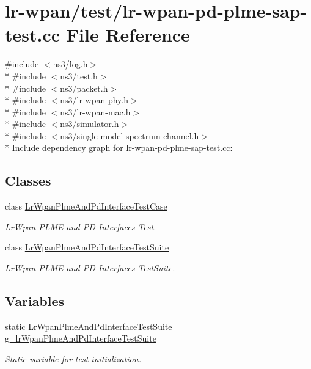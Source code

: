 \hypertarget{lr-wpan-pd-plme-sap-test_8cc}{}\section{lr-\/wpan/test/lr-\/wpan-\/pd-\/plme-\/sap-\/test.cc File Reference}
\label{lr-wpan-pd-plme-sap-test_8cc}
{\ttfamily \#include $<$ns3/log.\+h$>$}\\*
{\ttfamily \#include $<$ns3/test.\+h$>$}\\*
{\ttfamily \#include $<$ns3/packet.\+h$>$}\\*
{\ttfamily \#include $<$ns3/lr-\/wpan-\/phy.\+h$>$}\\*
{\ttfamily \#include $<$ns3/lr-\/wpan-\/mac.\+h$>$}\\*
{\ttfamily \#include $<$ns3/simulator.\+h$>$}\\*
{\ttfamily \#include $<$ns3/single-\/model-\/spectrum-\/channel.\+h$>$}\\*
Include dependency graph for lr-\/wpan-\/pd-\/plme-\/sap-\/test.cc\+:
\subsection*{Classes}
\begin{DoxyCompactItemize}
\item 
class \hyperlink{classLrWpanPlmeAndPdInterfaceTestCase}{Lr\+Wpan\+Plme\+And\+Pd\+Interface\+Test\+Case}
\begin{DoxyCompactList}\small\item\em Lr\+Wpan P\+L\+ME and PD Interfaces Test. \end{DoxyCompactList}\item 
class \hyperlink{classLrWpanPlmeAndPdInterfaceTestSuite}{Lr\+Wpan\+Plme\+And\+Pd\+Interface\+Test\+Suite}
\begin{DoxyCompactList}\small\item\em Lr\+Wpan P\+L\+ME and PD Interfaces Test\+Suite. \end{DoxyCompactList}\end{DoxyCompactItemize}
\subsection*{Variables}
\begin{DoxyCompactItemize}
\item 
static \hyperlink{classLrWpanPlmeAndPdInterfaceTestSuite}{Lr\+Wpan\+Plme\+And\+Pd\+Interface\+Test\+Suite} \hyperlink{lr-wpan-pd-plme-sap-test_8cc_aeb7bf4f28564852aa2f5c51ef25aeba4}{g\+\_\+lr\+Wpan\+Plme\+And\+Pd\+Interface\+Test\+Suite}
\begin{DoxyCompactList}\small\item\em Static variable for test initialization. \end{DoxyCompactList}\end{DoxyCompactItemize}


